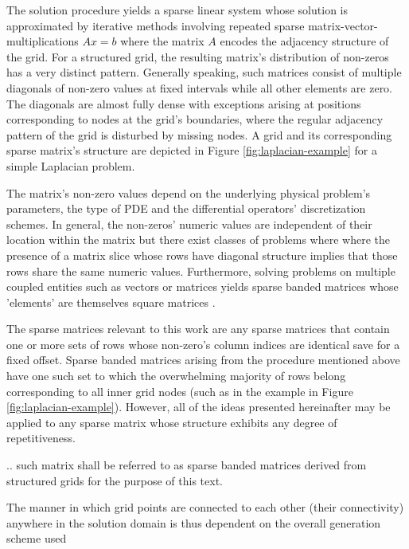     The solution procedure yields a sparse linear system whose solution is approximated by iterative methods involving
    repeated sparse matrix-vector-multiplications $Ax = b$ where the matrix $A$ encodes the adjacency structure of the
    grid. For a structured grid, the resulting matrix's distribution of non-zeros has a very distinct pattern. Generally
    speaking, such matrices consist of multiple diagonals of non-zero values at fixed intervals while all other elements
    are zero. The diagonals are almost fully dense with exceptions arising at positions corresponding to nodes at the
    grid's boundaries, where the regular adjacency pattern of the grid is disturbed by missing nodes. A grid and its
    corresponding sparse matrix's structure are depicted in Figure \ref{fig:laplacian-example} for a simple Laplacian
    problem.

    The matrix's non-zero values depend on the underlying physical problem's parameters, the type of PDE and the
    differential operators' discretization schemes. In general, the non-zeros' numeric values are independent of their
    location within the matrix but there exist classes of problems where where the presence of a matrix slice whose rows
    have diagonal structure implies that those rows share the same numeric values. Furthermore, solving problems on
    multiple coupled entities such as vectors or matrices yields sparse banded matrices whose 'elements' are themselves
    square matrices \cite{Godwin2013}.

    The sparse matrices relevant to this work are any sparse matrices that contain one or more sets of rows whose
    non-zero's column indices are identical save for a fixed offset. Sparse banded matrices arising from the procedure
    mentioned above have one such set to which the overwhelming majority of rows belong corresponding to all inner grid
    nodes (such as in the example in Figure \ref{fig:laplacian-example}). However, all of the ideas presented
    hereinafter may be applied to any sparse matrix whose structure exhibits any degree of repetitiveness.

  .. such matrix shall be referred to as sparse banded matrices derived from structured grids for the purpose of this
  text.

  The manner in which grid points are connected to each other (their connectivity) anywhere in the solution domain is thus
  dependent on the overall generation scheme used




